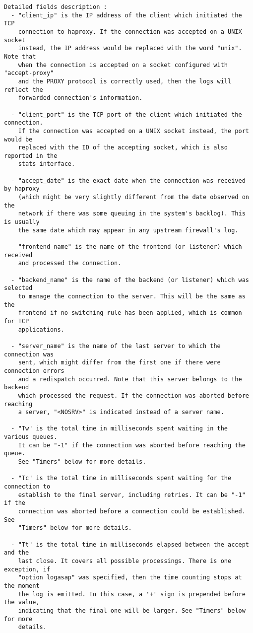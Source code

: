 \begin{verbatim}
Detailed fields description :
  - "client_ip" is the IP address of the client which initiated the TCP
    connection to haproxy. If the connection was accepted on a UNIX socket
    instead, the IP address would be replaced with the word "unix". Note that
    when the connection is accepted on a socket configured with "accept-proxy"
    and the PROXY protocol is correctly used, then the logs will reflect the
    forwarded connection's information.

  - "client_port" is the TCP port of the client which initiated the connection.
    If the connection was accepted on a UNIX socket instead, the port would be
    replaced with the ID of the accepting socket, which is also reported in the
    stats interface.

  - "accept_date" is the exact date when the connection was received by haproxy
    (which might be very slightly different from the date observed on the
    network if there was some queuing in the system's backlog). This is usually
    the same date which may appear in any upstream firewall's log.

  - "frontend_name" is the name of the frontend (or listener) which received
    and processed the connection.

  - "backend_name" is the name of the backend (or listener) which was selected
    to manage the connection to the server. This will be the same as the
    frontend if no switching rule has been applied, which is common for TCP
    applications.

  - "server_name" is the name of the last server to which the connection was
    sent, which might differ from the first one if there were connection errors
    and a redispatch occurred. Note that this server belongs to the backend
    which processed the request. If the connection was aborted before reaching
    a server, "<NOSRV>" is indicated instead of a server name.

  - "Tw" is the total time in milliseconds spent waiting in the various queues.
    It can be "-1" if the connection was aborted before reaching the queue.
    See "Timers" below for more details.

  - "Tc" is the total time in milliseconds spent waiting for the connection to
    establish to the final server, including retries. It can be "-1" if the
    connection was aborted before a connection could be established. See
    "Timers" below for more details.

  - "Tt" is the total time in milliseconds elapsed between the accept and the
    last close. It covers all possible processings. There is one exception, if
    "option logasap" was specified, then the time counting stops at the moment
    the log is emitted. In this case, a '+' sign is prepended before the value,
    indicating that the final one will be larger. See "Timers" below for more
    details.


\end{verbatim}
